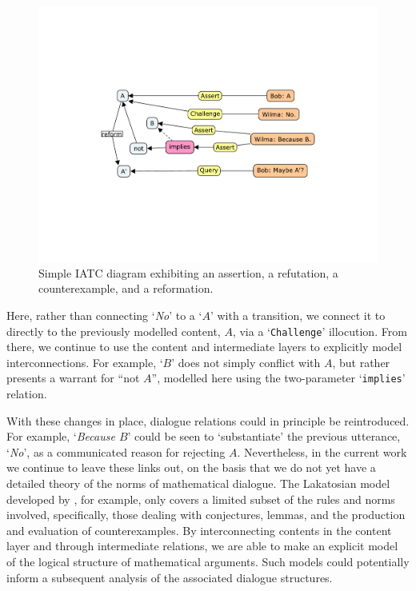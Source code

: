 \documentclass[smallextended,oneside]{svjour3}       %
\begin{document}
\begin{figure}
\vspace{-1.05cm}
\hspace{-.2cm}\includegraphics[width=.5\textwidth,trim=5cm 6cm 5cm 5.5cm, clip]{A-CounterExample-Rev}
\caption{Simple IATC diagram exhibiting an assertion, a refutation, a counterexample, and a reformation.\label{fig:A-Counterexample}}
\vspace{-.6cm}
\end{figure}

Here, rather than connecting `\emph{No}' to a `$A$' with a transition, we connect
it to directly to the previously modelled content, $A$, via a
`\texttt{Challenge}' illocution.  From there, we continue
to use the content and intermediate layers to explicitly model
interconnections.  For example,
`$B$' does not simply conflict with $A$, but rather presents a
warrant for ``not $A$'', modelled here using the two-parameter
`\texttt{implies}' relation.

With these changes in place, dialogue relations could in principle
be reintroduced.
For example, `\emph{Because $B$}' could be seen
to `substantiate' the previous utterance, `\emph{No}', as a communicated
reason for rejecting $A$.
Nevertheless, in the current work we continue to leave these links out, on the
basis that we do not yet have a detailed theory of the norms of mathematical dialogue.
The Lakatosian model developed by \citet{lak}, for example, only covers
a limited subset of the rules
and norms involved, specifically, those dealing with conjectures,
lemmas, and the production and evaluation of counterexamples.
By interconnecting contents in the content layer
and through intermediate relations,
we are able to make an explicit model of the logical structure of mathematical arguments.  Such models could potentially inform a subsequent analysis of the associated dialogue structures.
\end{document}
